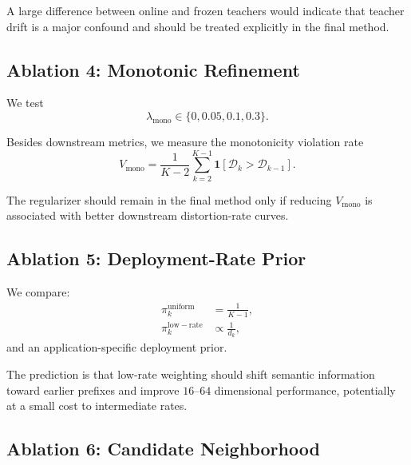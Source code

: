 \documentclass[11pt]{article}
\newcommand{\cD}{\mathcal{D}}
\begin{document}
A large difference between online and frozen teachers would indicate that teacher drift is a major confound and should be treated explicitly in the final method.


\subsection{Ablation 4: Monotonic Refinement}

We test
\begin{equation}
    \lambda_{\mathrm{mono}}
    \in
    \{0,0.05,0.1,0.3\}.
\end{equation}

Besides downstream metrics, we measure the monotonicity violation rate
\begin{equation}
\boxed{
    V_{\mathrm{mono}}
    =
    \frac{1}{K-2}
    \sum_{k=2}^{K-1}
    \mathbf{1}
    [
        \cD_k>\cD_{k-1}
    ].
}
\end{equation}

The regularizer should remain in the final method only if reducing $V_{\mathrm{mono}}$ is associated with better downstream distortion-rate curves.


\subsection{Ablation 5: Deployment-Rate Prior}

We compare:
\begin{align}
    \pi_k^{\mathrm{uniform}}
    &=
    \frac{1}{K-1},
    \\
    \pi_k^{\mathrm{low-rate}}
    &\propto
    \frac{1}{d_k},
\end{align}
and an application-specific deployment prior.

The prediction is that low-rate weighting should shift semantic information toward earlier prefixes and improve $16$--$64$ dimensional performance, potentially at a small cost to intermediate rates.


\subsection{Ablation 6: Candidate Neighborhood}
\end{document}
